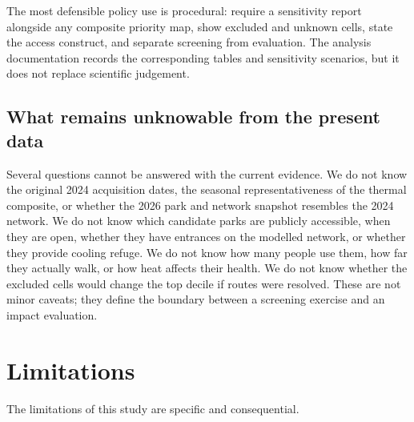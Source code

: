 \documentclass[times,twoside]{_Templates/MultiTargetManuscript}
\begin{document}
The most defensible policy use is procedural: require a sensitivity report
alongside any composite priority map, show excluded and unknown cells, state the
access construct, and separate screening from evaluation. The analysis
documentation records the corresponding tables and sensitivity scenarios, but
it does not replace scientific judgement.

\subsection{What remains unknowable from the present data}

Several questions cannot be answered with the current evidence. We do not know
the original 2024 acquisition dates, the seasonal representativeness of the
thermal composite, or whether the 2026 park and network snapshot resembles the
2024 network. We do not know which candidate parks are publicly accessible, when
they are open, whether they have entrances on the modelled network, or whether
they provide cooling refuge. We do not know how many people use them, how far
they actually walk, or how heat affects their health. We do not know whether the
excluded cells would change the top decile if routes were resolved. These are
not minor caveats; they define the boundary between a screening exercise and an
impact evaluation.

\section{Limitations}

The limitations of this study are specific and consequential.
\end{document}
